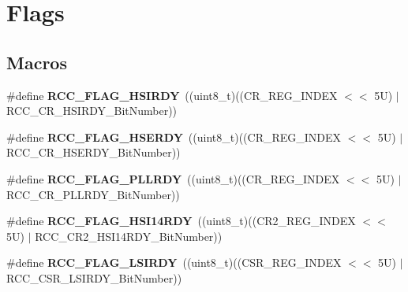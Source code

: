 \hypertarget{group___r_c_c___flag}{}\section{Flags}
\label{group___r_c_c___flag}
\subsection*{Macros}
\begin{DoxyCompactItemize}
\item 
\mbox{\label{group___r_c_c___flag_ga827d986723e7ce652fa733bb8184d216}} 
\#define {\bfseries R\+C\+C\+\_\+\+F\+L\+A\+G\+\_\+\+H\+S\+I\+R\+DY}~((uint8\+\_\+t)((C\+R\+\_\+\+R\+E\+G\+\_\+\+I\+N\+D\+EX $<$$<$ 5\+U) $\vert$ R\+C\+C\+\_\+\+C\+R\+\_\+\+H\+S\+I\+R\+D\+Y\+\_\+\+Bit\+Number))
\item 
\mbox{\label{group___r_c_c___flag_ga173edf47bec93cf269a0e8d0fec9997c}} 
\#define {\bfseries R\+C\+C\+\_\+\+F\+L\+A\+G\+\_\+\+H\+S\+E\+R\+DY}~((uint8\+\_\+t)((C\+R\+\_\+\+R\+E\+G\+\_\+\+I\+N\+D\+EX $<$$<$ 5\+U) $\vert$ R\+C\+C\+\_\+\+C\+R\+\_\+\+H\+S\+E\+R\+D\+Y\+\_\+\+Bit\+Number))
\item 
\mbox{\label{group___r_c_c___flag_gaf82d8afb18d9df75db1d6c08b9c50046}} 
\#define {\bfseries R\+C\+C\+\_\+\+F\+L\+A\+G\+\_\+\+P\+L\+L\+R\+DY}~((uint8\+\_\+t)((C\+R\+\_\+\+R\+E\+G\+\_\+\+I\+N\+D\+EX $<$$<$ 5\+U) $\vert$ R\+C\+C\+\_\+\+C\+R\+\_\+\+P\+L\+L\+R\+D\+Y\+\_\+\+Bit\+Number))
\item 
\mbox{\label{group___r_c_c___flag_ga8757cbfae2c0b6871d9e3ddedff95420}} 
\#define {\bfseries R\+C\+C\+\_\+\+F\+L\+A\+G\+\_\+\+H\+S\+I14\+R\+DY}~((uint8\+\_\+t)((C\+R2\+\_\+\+R\+E\+G\+\_\+\+I\+N\+D\+EX $<$$<$ 5\+U) $\vert$ R\+C\+C\+\_\+\+C\+R2\+\_\+\+H\+S\+I14\+R\+D\+Y\+\_\+\+Bit\+Number))
\item 
\mbox{\label{group___r_c_c___flag_ga8c5e4992314d347597621bfe7ab10d72}} 
\#define {\bfseries R\+C\+C\+\_\+\+F\+L\+A\+G\+\_\+\+L\+S\+I\+R\+DY}~((uint8\+\_\+t)((C\+S\+R\+\_\+\+R\+E\+G\+\_\+\+I\+N\+D\+EX $<$$<$ 5\+U) $\vert$ R\+C\+C\+\_\+\+C\+S\+R\+\_\+\+L\+S\+I\+R\+D\+Y\+\_\+\+Bit\+Number))
\item 
\mbox{\label{group___r_c_c___flag_ga9bacaedece5c7cb6d9e52c1412e1a8ae}} 
$$
\end{DoxyCompactItemize}
